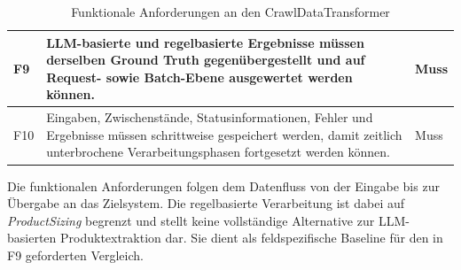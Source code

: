 \begin{table}[H]
\begin{tabular}{
        |p{}
        |p{}
        |p{}|
    }
        F9 &
        LLM-basierte und regelbasierte Ergebnisse müssen derselben Ground Truth gegenübergestellt und auf Request- sowie Batch-Ebene ausgewertet werden können. &
        Muss \\
        \hline

        F10 &
        Eingaben, Zwischenstände, Statusinformationen, Fehler und Ergebnisse müssen schrittweise gespeichert werden, damit zeitlich unterbrochene Verarbeitungsphasen fortgesetzt werden können. &
        Muss \\
        \hline
    \end{tabular}
    \caption{Funktionale Anforderungen an den CrawlDataTransformer}
    \label{tab:functional-requirements}
\end{table}

Die funktionalen Anforderungen folgen dem Datenfluss von der Eingabe bis zur Übergabe an das Zielsystem. Die regelbasierte Verarbeitung ist dabei auf \textit{ProductSizing} begrenzt 
und stellt keine vollständige Alternative zur LLM-basierten Produktextraktion dar. Sie dient als feldspezifische Baseline für den in F9 geforderten Vergleich.

